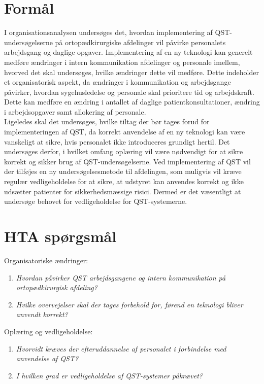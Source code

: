 \section{Formål}
I organisationsanalysen undersøges det, hvordan implementering af QST-undersøgelserne på ortopædkirurgiske afdelinger vil påvirke personalets arbejdsgang og daglige opgaver. Implementering af en ny teknologi kan generelt medføre ændringer i intern kommunikation afdelinger og personale imellem, hvorved det skal undersøges, hvilke ændringer dette vil medføre. Dette indeholder et organisatorisk aspekt, da ændringer i kommunikation og arbejdsgange påvirker, hvordan sygehusledelse og personale skal prioritere tid og arbejdskraft. Dette kan medføre en ændring i antallet af daglige patientkonsultationer, ændring i arbejdsopgaver samt allokering af personale. \\
Ligeledes skal det undersøges, hvilke tiltag der bør tages forud for implementeringen af QST, da korrekt anvendelse af en ny teknologi kan være vanskeligt at sikre, hvis personalet ikke introduceres grundigt hertil. Det undersøges derfor, i hvilket omfang oplæring vil være nødvendigt for at sikre korrekt og sikker brug af QST-undersøgelserne. Ved implementering af QST vil der tilføjes en ny undersøgelsesmetode til afdelingen, som muligvis vil kræve regulær vedligeholdelse for at sikre, at udstyret kan anvendes korrekt og ikke udsætter patienter for sikkerhedsmæssige risici. Dermed er det væsentligt at undersøge behovet for vedligeholdelse for QST-systemerne.


\section{HTA spørgsmål}
Organisatoriske ændringer:
\begin{enumerate}
\item \textit{Hvordan påvirker QST arbejdsgangene og intern kommunikation på ortopædkirurgisk afdeling?} %
\item \textit{Hvilke overvejelser skal der tages forbehold for, førend en teknologi bliver anvendt korrekt?} %
\end{enumerate}
Oplæring og vedligeholdelse:
\begin{enumerate}[resume]
\item \textit{Hvorvidt kræves der efteruddannelse af personalet i forbindelse med anvendelse af QST?} %
\item \textit{I hvilken grad er vedligeholdelse af QST-systemer påkrævet?} %
\end{enumerate}


